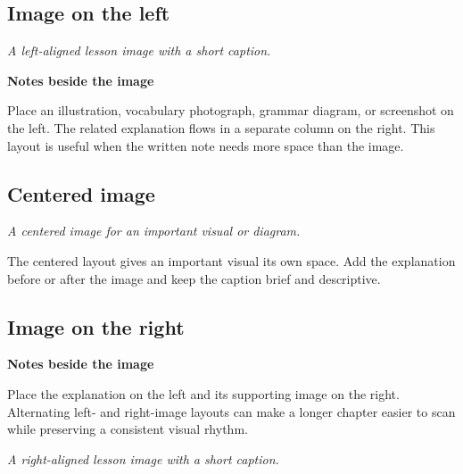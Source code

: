 \documentclass[11pt,openany]{book}
\newcommand{\PhotoCaption}[1]{%
  \par\smallskip
  {\small\color{GermanBlack!70}\itshape #1\par}
} %
\begin{document}
%
%
%
\subsection*{Image on the left}

\noindent
\begin{minipage}[t]{0.36\textwidth}
  \vspace{0pt}
  \centering
  \PhotoCaption{A left-aligned lesson image with a short caption.}
\end{minipage}\hfill
\begin{minipage}[t]{0.60\textwidth}
  \vspace{0pt}
  \textbf{Notes beside the image}

  Place an illustration, vocabulary photograph, grammar diagram, or screenshot
  on the left. The related explanation flows in a separate column on the right.
  This layout is useful when the written note needs more space than the image.
\end{minipage}

\subsection*{Centered image}

\begin{center}
  \begin{minipage}{0.72\textwidth}
    \centering
    \PhotoCaption{A centered image for an important visual or diagram.}
  \end{minipage}
\end{center}

The centered layout gives an important visual its own space. Add the explanation
before or after the image and keep the caption brief and descriptive.

\subsection*{Image on the right}

\noindent
\begin{minipage}[t]{0.60\textwidth}
  \vspace{0pt}
  \textbf{Notes beside the image}

  Place the explanation on the left and its supporting image on the right.
  Alternating left- and right-image layouts can make a longer chapter easier to
  scan while preserving a consistent visual rhythm.
\end{minipage}\hfill
\begin{minipage}[t]{0.36\textwidth}
  \vspace{0pt}
  \centering
  \PhotoCaption{A right-aligned lesson image with a short caption.}
\end{minipage}
\end{document}
